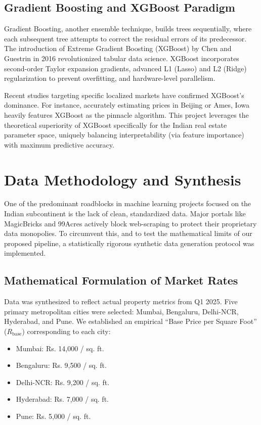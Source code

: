 \documentclass[conference]{IEEEtran}
\begin{document}
\subsection{Gradient Boosting and XGBoost Paradigm}
Gradient Boosting, another ensemble technique, builds trees sequentially, where each subsequent tree attempts to correct the residual errors of its predecessor. The introduction of Extreme Gradient Boosting (XGBoost) by Chen and Guestrin in 2016 \cite{xgboost} revolutionized tabular data science. XGBoost incorporates second-order Taylor expansion gradients, advanced L1 (Lasso) and L2 (Ridge) regularization to prevent overfitting, and hardware-level parallelism.

Recent studies targeting specific localized markets have confirmed XGBoost’s dominance. For instance, accurately estimating prices in Beijing \cite{beijing} or Ames, Iowa \cite{ames} heavily features XGBoost as the pinnacle algorithm. This project leverages the theoretical superiority of XGBoost specifically for the Indian real estate parameter space, uniquely balancing interpretability (via feature importance) with maximum predictive accuracy.

\section{Data Methodology and Synthesis}

One of the predominant roadblocks in machine learning projects focused on the Indian subcontinent is the lack of clean, standardized data. Major portals like MagicBricks and 99Acres actively block web-scraping to protect their proprietary data monopolies. To circumvent this, and to test the mathematical limits of our proposed pipeline, a statistically rigorous synthetic data generation protocol was implemented.

\subsection{Mathematical Formulation of Market Rates}
Data was synthesized to reflect actual property metrics from Q1 2025. Five primary metropolitan cities were selected: Mumbai, Bengaluru, Delhi-NCR, Hyderabad, and Pune. We established an empirical ``Base Price per Square Foot'' ($R_{\text{base}}$) corresponding to each city:
\begin{itemize}
    \item Mumbai: Rs. 14,000 / sq. ft.
    \item Bengaluru: Rs. 9,500 / sq. ft.
    \item Delhi-NCR: Rs. 9,200 / sq. ft.
    \item Hyderabad: Rs. 7,000 / sq. ft.
    \item Pune: Rs. 5,000 / sq. ft.
\end{itemize}
\end{document}
